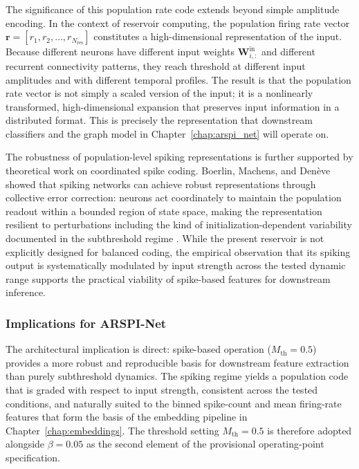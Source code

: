 The significance of this population rate code extends beyond simple amplitude encoding. In the context of reservoir computing, the population firing rate vector $\mathbf{r} = [r_1, r_2, \ldots, r_{N_{\text{res}}}]$ constitutes a high-dimensional representation of the input. Because different neurons have different input weights $\mathbf{W}^{\text{in}}_{i,:}$ and different recurrent connectivity patterns, they reach threshold at different input amplitudes and with different temporal profiles. The result is that the population rate vector is not simply a scaled version of the input; it is a nonlinearly transformed, high-dimensional expansion that preserves input information in a distributed format. This is precisely the representation that downstream classifiers and the graph model in Chapter~\ref{chap:arspi_net} will operate on.

The robustness of population-level spiking representations is further supported by theoretical work on coordinated spike coding. Boerlin, Machens, and Denève showed that spiking networks can achieve robust representations through collective error correction: neurons act coordinately to maintain the population readout within a bounded region of state space, making the representation resilient to perturbations including the kind of initialization-dependent variability documented in the subthreshold regime \cite{Boerlin2013_PredictiveCoding}. While the present reservoir is not explicitly designed for balanced coding, the empirical observation that its spiking output is systematically modulated by input strength across the tested dynamic range supports the practical viability of spike-based features for downstream inference.

\subsubsection{Implications for ARSPI-Net}

The architectural implication is direct: spike-based operation ($M_{\text{th}} = 0.5$) provides a more robust and reproducible basis for downstream feature extraction than purely subthreshold dynamics. The spiking regime yields a population code that is graded with respect to input strength, consistent across the tested conditions, and naturally suited to the binned spike-count and mean firing-rate features that form the basis of the embedding pipeline in Chapter~\ref{chap:embeddings}. The threshold setting $M_{\text{th}} = 0.5$ is therefore adopted alongside $\beta = 0.05$ as the second element of the provisional operating-point specification.


